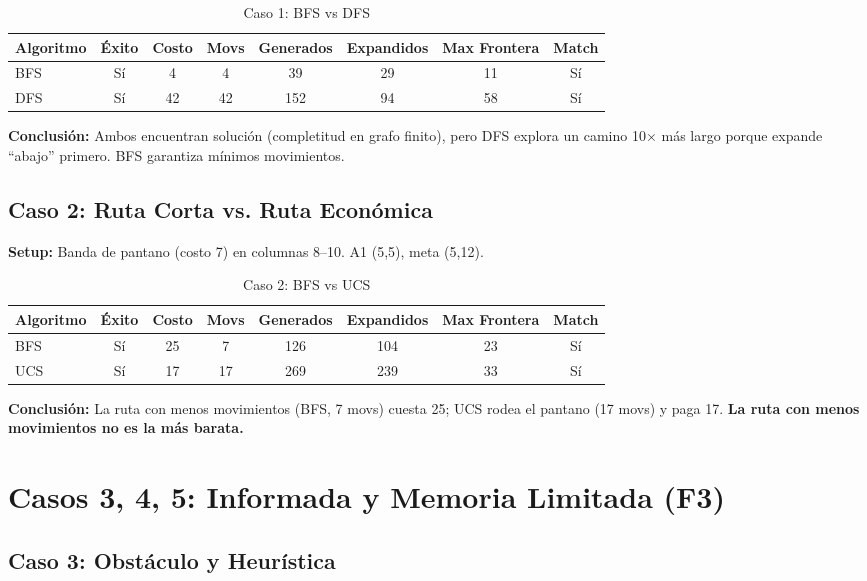 \begin{table}[H]
\centering
\caption{Caso 1: BFS vs DFS}
\begin{tabular}{lccccccc}
\toprule
Algoritmo & Éxito & Costo & Movs & Generados & Expandidos & Max Frontera & Match \\
\midrule
BFS & Sí & 4 & 4 & 39 & 29 & 11 & Sí \\
DFS & Sí & 42 & 42 & 152 & 94 & 58 & Sí \\
\bottomrule
\end{tabular}
\end{table}
\label{tab:caso1}

\textbf{Conclusión:} Ambos encuentran solución (completitud en grafo finito), pero DFS explora
un camino 10$\times$ más largo porque expande ``abajo'' primero. BFS garantiza mínimos
movimientos.

\subsection{Caso 2: Ruta Corta vs. Ruta Económica}
\label{sec:experimento-caso2-detalle}

\textbf{Setup:} Banda de pantano (costo 7) en columnas 8--10. A1 (5,5), meta (5,12).

\begin{table}[H]
\centering
\caption{Caso 2: BFS vs UCS}
\begin{tabular}{lccccccc}
\toprule
Algoritmo & Éxito & Costo & Movs & Generados & Expandidos & Max Frontera & Match \\
\midrule
BFS & Sí & 25 & 7 & 126 & 104 & 23 & Sí \\
UCS & Sí & 17 & 17 & 269 & 239 & 33 & Sí \\
\bottomrule
\end{tabular}
\end{table}
\label{tab:caso2-detalle}

\textbf{Conclusión:} La ruta con menos movimientos (BFS, 7 movs) cuesta 25; UCS rodea el
pantano (17 movs) y paga 17. \textbf{La ruta con menos movimientos no es la más barata.}

\section{Casos 3, 4, 5: Informada y Memoria Limitada (F3)}
\label{sec:resultados-f3}

\subsection{Caso 3: Obstáculo y Heurística}
\label{sec:caso3}

